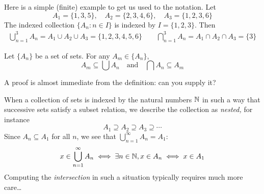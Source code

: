 \begin{example}{}{}
	Here is a simple (finite) example to get us used to the notation. Let
	\[
		A_1=\{1,3,5\},\quad A_2=\{2,3,4,6\},\quad A_3=\{1,2,3,6\}
	\]
	The indexed collection $\{A_n:n\in I\}$ is indexed by $I=\{1,2,3\}$. Then
	\begin{gather*}
		\bigcup_{n=1}^3A_n =A_1\cup A_2\cup A_3=\{1,2,3,4,5,6\} \qquad
		\bigcap_{n=1}^3A_n =A_1\cap A_2\cap A_3=\{3\}
	\end{gather*}
\end{example}


\begin{lemm}{}{}
	Let $\{A_n\}$ be a set of sets. For any $A_m\in \{A_n\}$,
	\[
		A_m\subseteq\bigcup A_n\quad\text{and}\quad \bigcap A_n\subseteq A_m
	\]
\end{lemm}

A proof is almost immediate from the definition: can you supply it?




When a collection of sets is indexed by the natural numbers $\mathbb{N}$ in such a way that successive sets satisfy a subset relation, we describe the collection as \emph{nested,} for instance
\[
	A_1\supseteq A_2\supseteq A_3\supseteq\cdots
\]
Since $A_n\subseteq A_1$ for all $n$, we see that $\bigcup_{n=1}^\infty A_n=A_1$:
\[
	x\in\bigcup_{n=1}^\infty A_n\iff \exists n\in\mathbb{N}, x\in A_n  \iff x\in A_1
\]
Computing the \emph{intersection} in such a situation typically requires much more care\ldots

